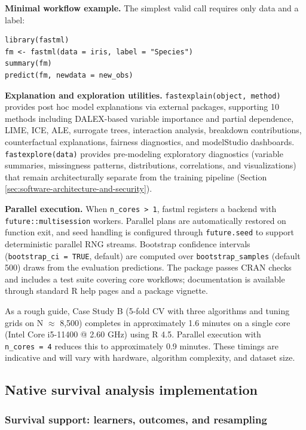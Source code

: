 \textbf{Minimal workflow example.} The simplest valid call requires only data and a label:

\begin{verbatim}
library(fastml)
fm <- fastml(data = iris, label = "Species")
summary(fm)
predict(fm, newdata = new_obs)
\end{verbatim}

\textbf{Explanation and exploration utilities.} \texttt{fastexplain(object,\ method)} provides post hoc model explanations via external packages, supporting 10 methods including DALEX-based variable importance and partial dependence, LIME, ICE, ALE, surrogate trees, interaction analysis, breakdown contributions, counterfactual explanations, fairness diagnostics, and modelStudio dashboards. \texttt{fastexplore(data)} provides pre-modeling exploratory diagnostics (variable summaries, missingness patterns, distributions, correlations, and visualizations) that remain architecturally separate from the training pipeline (Section \ref{sec:software-architecture-and-security}).

\textbf{Parallel execution.} When \texttt{n\_cores\ \textgreater{}\ 1}, fastml registers a  backend with \texttt{future::multisession} workers. Parallel plans are automatically restored on function exit, and seed handling is configured through \texttt{future.seed} to support deterministic parallel RNG streams. Bootstrap confidence intervals (\texttt{bootstrap\_ci\ =\ TRUE}, default) are computed over \texttt{bootstrap\_samples} (default 500) draws from the evaluation predictions. The package passes CRAN checks and includes a test suite covering core workflows; documentation is available through standard R help pages and a package vignette.

As a rough guide, Case Study B (5-fold CV with three algorithms and tuning grids on N \(\approx\) 8,500) completes in approximately 1.6 minutes on a single core (Intel Core i5-11400 @ 2.60 GHz) using R 4.5. Parallel execution with \texttt{n\_cores\ =\ 4} reduces this to approximately 0.9 minutes. These timings are indicative and will vary with hardware, algorithm complexity, and dataset size.

\subsection{Native survival analysis implementation}\label{sec:native-survival}

\subsubsection{Survival support: learners, outcomes, and resampling}\label{survival-support-learners-outcomes-and-resampling}

